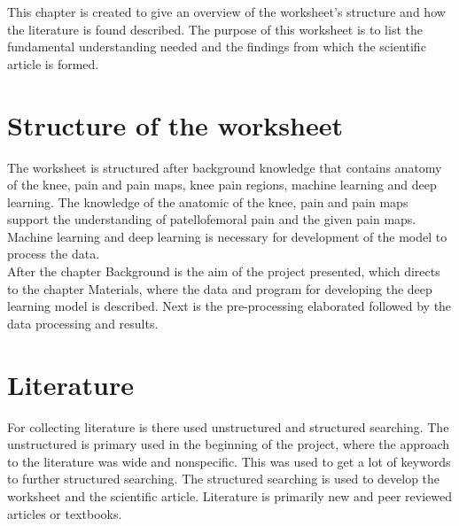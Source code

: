 This chapter is created to give an overview of the worksheet’s structure and how the literature is found described. 
The purpose of this worksheet is to list the fundamental understanding needed and the findings from which the scientific article is formed. 

\section{Structure of the worksheet}
The worksheet is structured after background knowledge that contains anatomy of the knee, pain and pain maps, knee pain regions, machine learning and deep learning. The knowledge of the anatomic of the knee, pain and pain maps support the understanding of patellofemoral pain and the given pain maps. Machine learning and deep learning is necessary for development of the model to process the data. \\
\noindent
After the chapter Background is the aim of the project presented, which directs to the chapter Materials, where the data and program for developing the deep learning model is described. Next is the pre-processing elaborated followed by the data processing and results. 

\section{Literature}
For collecting literature is there used unstructured and structured searching. The unstructured is primary used in the beginning of the project, where the approach to the literature was wide and nonspecific. This was used to get a lot of keywords to further structured searching. The structured searching is used to develop the worksheet and the scientific article. Literature is primarily new and peer reviewed articles or textbooks.

